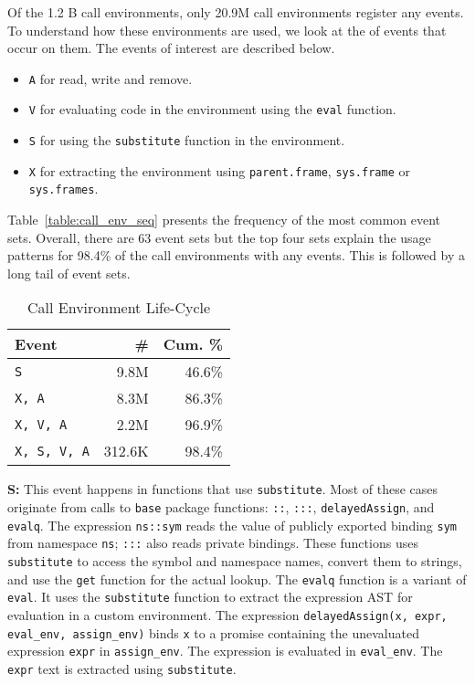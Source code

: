 \documentclass[10pt,review,sigplan,anonymous=true,authorversion=true,nonacm=true]{acmart}
\newcommand{\code}[1]{\lstinline |#1|\xspace}
\newcommand{\base}{\code{base}}
\newcommand{\eval}{\code{eval}}
\newcommand{\substitute}{\code{substitute}}
\begin{document}
Of the 1.2 B call environments, only 20.9M call environments register any
events. To understand how these environments are used, we look at the of events
that occur on them. The events of interest are described below.
\begin{itemize}
\item \texttt{A} for read, write and remove.
\item \texttt{V} for evaluating code in the environment using the \eval function.
\item \texttt{S} for using the \substitute function in the environment.
\item \texttt{X} for extracting the environment using \code{parent.frame}, \code{sys.frame} or \code{sys.frames}.
\end{itemize}

Table~\ref{table:call_env_seq} presents the frequency of the most common event
sets. Overall, there are 63 event sets but the top four sets explain the
usage patterns for 98.4\% of the call environments with any events. This is
followed by a long tail of event sets.

\begin{table}[!h]
  \vspace{-3mm}
  \small
  \caption{Call Environment Life-Cycle} \label{table:call_env_life_cycle}
  \centering
  \begin{tabular}{lrr}
    \toprule
    \textbf{Event}&\textbf{\#}&\textbf{Cum. \%}\\
    \midrule
    \texttt{S}&9.8M&46.6\%\\
    \texttt{X, A}&8.3M&86.3\%\\
    \texttt{X, V, A}&2.2M&96.9\%\\
    \texttt{X, S, V, A}&312.6K&98.4\%\\
    \bottomrule
  \end{tabular}
\end{table}

\noindent
\textbf{S:} This event happens in functions that use \code{substitute}.
  Most of these cases originate from calls to \base package functions:
  \code{::}, \code{:::}, \code{delayedAssign}, and \code{evalq}. The expression
  \code{ns::sym} reads the value of publicly exported binding \code{sym} from
  namespace \code{ns}; \code{:::} also reads private bindings. These functions
  uses \substitute to access the symbol and namespace names, convert them to
  strings, and use the \code{get} function for the actual lookup. The
  \code{evalq} function is a variant of \eval. It uses the \substitute function
  to extract the expression AST for evaluation in a custom environment. The
  expression \code{delayedAssign(x, expr, eval_env, assign_env)} binds \code{x}
  to a promise containing the unevaluated expression \code{expr} in
  \code{assign_env}. The expression is evaluated in \code{eval_env}. The
  \code{expr} text is extracted using \code{substitute}.
\end{document}
